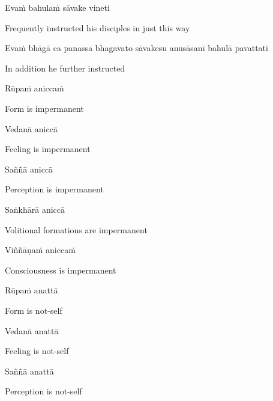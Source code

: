 Evaṁ bahulaṁ sāvake vineti

\begin{cprenglish}
  Frequently instructed his disciples in just this way
\end{cprenglish}

Evaṁ bhāgā ca panassa bhagavato sāvakesu anusāsanī bahulā pavattati

\begin{cprenglish}
  In addition he further instructed
\end{cprenglish}

Rūpaṁ aniccaṁ

\begin{cprenglish}
  Form is impermanent
\end{cprenglish}

Vedanā aniccā

\begin{cprenglish}
  Feeling is impermanent
\end{cprenglish}

Saññā aniccā

\begin{cprenglish}
  Perception is impermanent
\end{cprenglish}

Saṅkhārā aniccā

\begin{cprenglish}
  Volitional formations are impermanent
\end{cprenglish}

Viññāṇaṁ aniccaṁ

\begin{cprenglish}
  Consciousness is impermanent
\end{cprenglish}

Rūpaṁ anattā

\begin{cprenglish}
  Form is not-self
\end{cprenglish}

Vedanā anattā

\begin{cprenglish}
  Feeling is not-self
\end{cprenglish}

Saññā anattā

\begin{cprenglish}
  Perception is not-self
\end{cprenglish}

